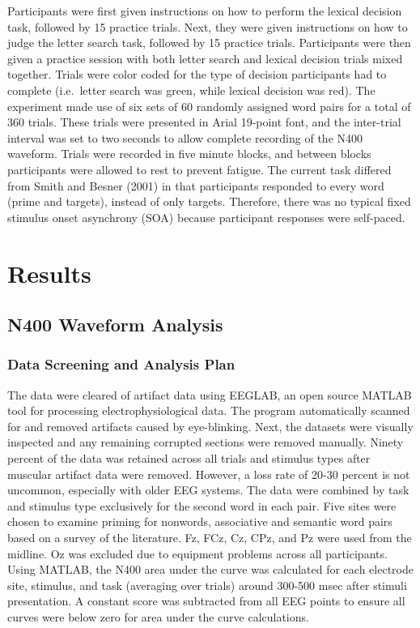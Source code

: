 \documentclass[english,man]{apa6}
\theoremstyle{definition}
\theoremstyle{definition}
\theoremstyle{definition}
\theoremstyle{remark}
\begin{document}
Participants were first given instructions on how to perform the lexical
decision task, followed by 15 practice trials. Next, they were given
instructions on how to judge the letter search task, followed by 15
practice trials. Participants were then given a practice session with
both letter search and lexical decision trials mixed together. Trials
were color coded for the type of decision participants had to complete
(i.e.~letter search was green, while lexical decision was red). The
experiment made use of six sets of 60 randomly assigned word pairs for a
total of 360 trials. These trials were presented in Arial 19-point font,
and the inter-trial interval was set to two seconds to allow complete
recording of the N400 waveform. Trials were recorded in five minute
blocks, and between blocks participants were allowed to rest to prevent
fatigue. The current task differed from Smith and Besner (2001) in that
participants responded to every word (prime and targets), instead of
only targets. Therefore, there was no typical fixed stimulus onset
asynchrony (SOA) because participant responses were self-paced.

\section{Results}\label{results}

\subsection{N400 Waveform Analysis}\label{n400-waveform-analysis}

\subsubsection{Data Screening and Analysis
Plan}\label{data-screening-and-analysis-plan}

The data were cleared of artifact data using EEGLAB, an open source
MATLAB tool for processing electrophysiological data. The program
automatically scanned for and removed artifacts caused by eye-blinking.
Next, the datasets were visually inspected and any remaining corrupted
sections were removed manually. Ninety percent of the data was retained
across all trials and stimulus types after muscular artifact data were
removed. However, a loss rate of 20-30 percent is not uncommon,
especially with older EEG systems. The data were combined by task and
stimulus type exclusively for the second word in each pair. Five sites
were chosen to examine priming for nonwords, associative and semantic
word pairs based on a survey of the literature. Fz, FCz, Cz, CPz, and Pz
were used from the midline. Oz was excluded due to equipment problems
across all participants. Using MATLAB, the N400 area under the curve was
calculated for each electrode site, stimulus, and task (averaging over
trials) around 300-500 msec after stimuli presentation. A constant score
was subtracted from all EEG points to ensure all curves were below zero
for area under the curve calculations.
\end{document}

